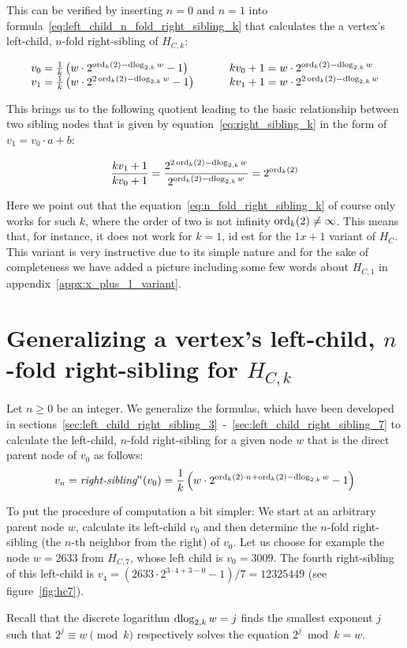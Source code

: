 This can be verified by inserting $n=0$ and $n=1$ into formula~\ref{eq:left_child_n_fold_right_sibling_k} that calculates the a vertex's left-child, $n$-fold right-sibling of $H_{C,k}$:

\[\arraycolsep=1.6em
\begin{array}{ll}
v_0=\frac{1}{k}\left(w\cdot2^{\ord_k(2)-\dlog_{2,k}w}-1\right) & kv_0+1=w\cdot2^{\ord_k(2)-\dlog_{2,k}w}\\
v_1=\frac{1}{k}\left(w\cdot2^{2\ord_k(2)-\dlog_{2,k}w}-1\right) & kv_1+1=w\cdot2^{2\ord_k(2)-\dlog_{2,k}w}
\end{array}
\]

This brings us to the following quotient leading to the basic relationship between two sibling nodes that is given by equation~\ref{eq:right_sibling_k} in the form of $v_1=v_0\cdot a+b$:

\[
\frac{kv_1+1}{kv_0+1}=\frac{2^{2\operatorname{ord}_k(2)-\operatorname{dlog}_{2,k}w}}{2^{\operatorname{ord}_k(2)-\operatorname{dlog}_{2,k}w}}=2^{\operatorname{ord}_k(2)}
\]

Here we point out that the equation~\ref{eq:n_fold_right_sibling_k} of course only works for such $k$, where the order of two is not infinity $\operatorname{ord}_k(2)\ne\infty$. This means that, for instance, it does not work for $k=1$, id est for the $1x+1$ variant of $H_C$. This variant is very instructive due to its simple nature and for the sake of completeness we have added a picture including some few words about $H_{C,1}$ in appendix~\ref{appx:x_plus_1_variant}.

\section{\texorpdfstring{Generalizing a vertex's left-child, $n$-fold right-sibling for $H_{C,k}$}{Generalizing vertex's left-child, n-fold right-sibling for HCk}}
Let $n\ge0$ be an integer. We generalize the formulas, which have been developed in sections~\ref{sec:left_child_right_sibling_3}~-~\ref{sec:left_child_right_sibling_7} to calculate the left-child, $n$-fold right-sibling for a given node $w$ that is the direct parent node of $v_0$ as follows:
\begin{equation}
\label{eq:left_child_n_fold_right_sibling_k}
v_n=\textit{right-sibling}^n(v_0)=\frac{1}{k}\left(w\cdot2^{\operatorname{ord}_k(2)\cdot n+\operatorname{ord}_k(2)-\operatorname{dlog}_{2,k}w}-1\right)
\end{equation}

To put the procedure of computation a bit simpler: We start at an arbitrary parent node $w$, calculate its left-child $v_0$ and then determine the $n$-fold right-sibling (the $n$-th neighbor from the right) of $v_0$. Let us choose for example the node $w=2633$ from $H_{C,7}$, whose left child is $v_0=3009$. The fourth right-sibling of this left-child is $v_4=(2633\cdot2^{3\cdot4+3-0}-1)/7=12325449$ (see figure~\ref{fig:hc7}).

Recall that the discrete logarithm $\operatorname{dlog}_{2,k}w=j$ finds the smallest exponent $j$ such that $2^j\equiv w\pmod k$ respectively solves the equation $2^j\bmod k=w$.
